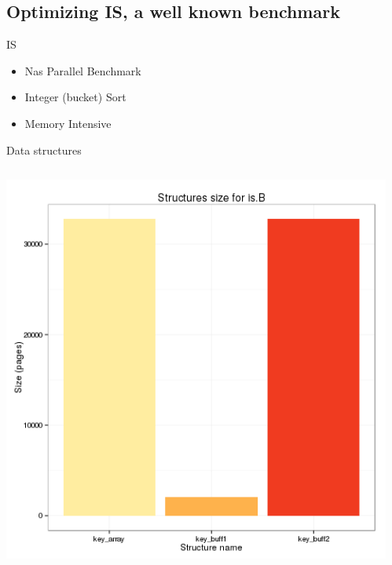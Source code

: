 \documentclass[xcolor={usenames,dvipsnames},hyperref={pdfusetitle}]{beamer}
\begin{document}
\subsection{Optimizing IS, a well known benchmark}

\begin{frame}{IS}
    \begin{itemize}
        \item Nas Parallel Benchmark~\cite{Jin99NPBOpenMP}
        \item Integer (bucket) Sort
        \item Memory Intensive
    \end{itemize}
\end{frame}

\begin{frame}{Data structures}
    \begin{columns}
        \begin{column}{.45\linewidth}
            \centering
            \includegraphics[width=\linewidth]{tabarnac/is_b_structs_sz.png}
        \end{column}
        \begin{column}{.45\linewidth}
            \centering

\end{column}
\end{columns}
\end{frame}
\end{document}
